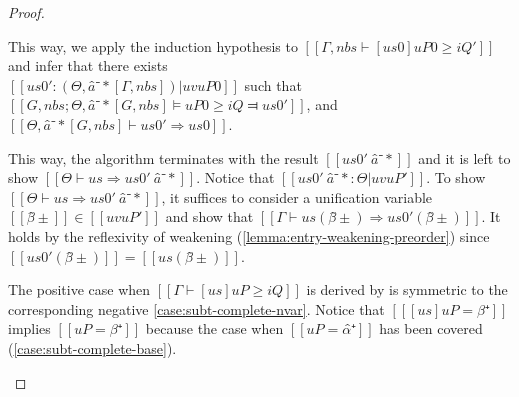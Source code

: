 \begin{proof}
\begin{caseof}
       This way, we apply the induction hypothesis to $[[Γ, nbs ⊢ [us0]uP0 ≥ iQ' ]]$ and 
       infer that there exists\\
        $[[us0' :  (Θ, â⁻*[Γ, nbs]) | uv uP0]]$ such that
       $[[G, nbs; Θ, â⁻*[G, nbs] ⊨ uP0 ≥ iQ ⫤ us0']]$,
       and $[[Θ, â⁻*[G, nbs] ⊢ us0' ⇒ us0]]$.

       This way, the algorithm terminates with the result $[[us0' \ {â⁻*}]]$
       and it is left to show $[[ Θ ⊢ us ⇒ us0' \ {â⁻*} ]]$. Notice that
       $[[us0' \ {â⁻*} : Θ | uv uP' ]]$. To show $[[ Θ ⊢ us ⇒ us0' \
       {â⁻*} ]]$, it suffices to consider a unification variable $[[β̂±]] \in 
       [[uv uP']]$ and show that $[[Γ ⊢ us(β̂±) ⇒ us0'(β̂±)]]$. It holds by the
       reflexivity of weakening (\cref{lemma:entry-weakening-preorder}) since
       $[[us0'(β̂±)]] = [[us(β̂±)]]$.

      \item The positive case when $[[Γ ⊢ [us]uP ≥ iQ]]$ is derived by 
      \ruleref{\ottdruleDOnePVarLabel} is symmetric to the corresponding negative
      \cref{case:subt-complete-nvar}.
      Notice that $[[ [us]uP = β⁺ ]]$ 
      implies $[[uP = β⁺]]$ because the case when $[[uP = α̂⁺]]$ has been covered 
      (\cref{case:subt-complete-base}).

    \end{caseof}
\end{proof}



